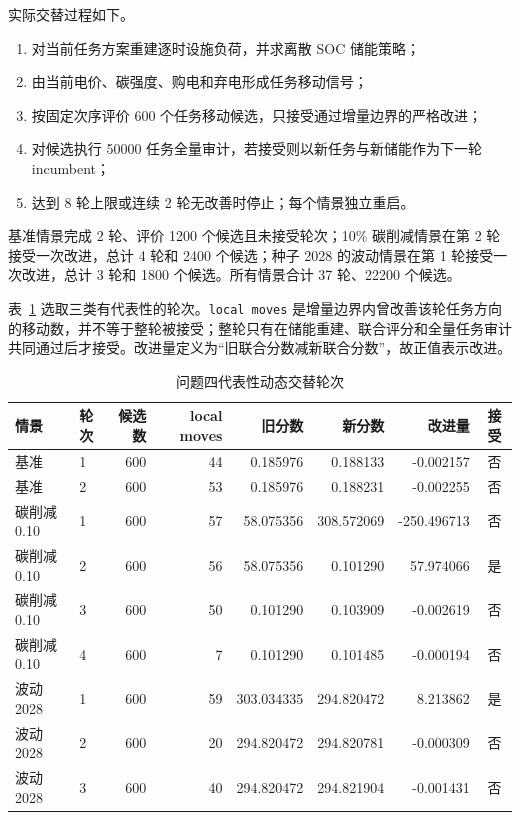 实际交替过程如下。
\begin{enumerate}
\item 对当前任务方案重建逐时设施负荷，并求离散 SOC 储能策略；
\item 由当前电价、碳强度、购电和弃电形成任务移动信号；
\item 按固定次序评价 600 个任务移动候选，只接受通过增量边界的严格改进；
\item 对候选执行 50000 任务全量审计，若接受则以新任务与新储能作为下一轮 incumbent；
\item 达到 8 轮上限或连续 2 轮无改善时停止；每个情景独立重启。
\end{enumerate}

基准情景完成 2 轮、评价 1200 个候选且未接受轮次；10\% 碳削减情景在第 2 轮接受一次改进，总计 4 轮和 2400 个候选；种子 2028 的波动情景在第 1 轮接受一次改进，总计 3 轮和 1800 个候选。所有情景合计 37 轮、22200 个候选。


表~\ref{tab:q4rounds} 选取三类有代表性的轮次。\texttt{local moves} 是增量边界内曾改善该轮任务方向的移动数，并不等于整轮被接受；整轮只有在储能重建、联合评分和全量任务审计共同通过后才接受。改进量定义为“旧联合分数减新联合分数”，故正值表示改进。
\begin{table}[H]\centering\scriptsize
\caption{问题四代表性动态交替轮次}\label{tab:q4rounds}
\begin{tabular}{llrrrrrc}\toprule
情景 & 轮次 & 候选数 & local moves & 旧分数 & 新分数 & 改进量 & 接受\\\midrule
基准 & 1 & 600 & 44 & 0.185976 & 0.188133 & -0.002157 & 否\\
基准 & 2 & 600 & 53 & 0.185976 & 0.188231 & -0.002255 & 否\\
碳削减 0.10 & 1 & 600 & 57 & 58.075356 & 308.572069 & -250.496713 & 否\\
碳削减 0.10 & 2 & 600 & 56 & 58.075356 & 0.101290 & 57.974066 & 是\\
碳削减 0.10 & 3 & 600 & 50 & 0.101290 & 0.103909 & -0.002619 & 否\\
碳削减 0.10 & 4 & 600 & 7 & 0.101290 & 0.101485 & -0.000194 & 否\\
波动 2028 & 1 & 600 & 59 & 303.034335 & 294.820472 & 8.213862 & 是\\
波动 2028 & 2 & 600 & 20 & 294.820472 & 294.820781 & -0.000309 & 否\\
波动 2028 & 3 & 600 & 40 & 294.820472 & 294.821904 & -0.001431 & 否\\\bottomrule
\end{tabular}
\end{table}

